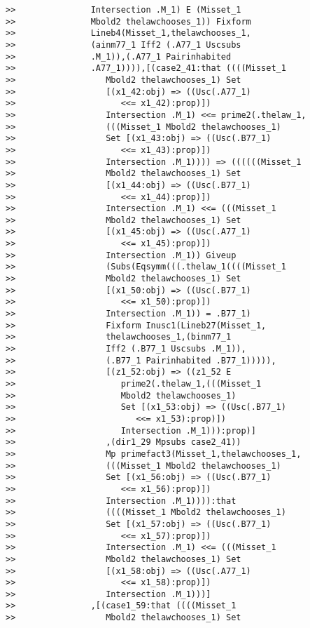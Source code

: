 \documentclass[12pt]{article}
\begin{document}
\begin{verbatim}
>>               Intersection .M_1) E (Misset_1
>>               Mbold2 thelawchooses_1)) Fixform
>>               Lineb4(Misset_1,thelawchooses_1,
>>               (ainm77_1 Iff2 (.A77_1 Uscsubs
>>               .M_1)),(.A77_1 Pairinhabited
>>               .A77_1)))),[(case2_41:that ((((Misset_1
>>                  Mbold2 thelawchooses_1) Set
>>                  [(x1_42:obj) => ((Usc(.A77_1)
>>                     <<= x1_42):prop)])
>>                  Intersection .M_1) <<= prime2(.thelaw_1,
>>                  (((Misset_1 Mbold2 thelawchooses_1)
>>                  Set [(x1_43:obj) => ((Usc(.B77_1)
>>                     <<= x1_43):prop)])
>>                  Intersection .M_1)))) => ((((((Misset_1
>>                  Mbold2 thelawchooses_1) Set
>>                  [(x1_44:obj) => ((Usc(.B77_1)
>>                     <<= x1_44):prop)])
>>                  Intersection .M_1) <<= (((Misset_1
>>                  Mbold2 thelawchooses_1) Set
>>                  [(x1_45:obj) => ((Usc(.A77_1)
>>                     <<= x1_45):prop)])
>>                  Intersection .M_1)) Giveup
>>                  (Subs(Eqsymm(((.thelaw_1((((Misset_1
>>                  Mbold2 thelawchooses_1) Set
>>                  [(x1_50:obj) => ((Usc(.B77_1)
>>                     <<= x1_50):prop)])
>>                  Intersection .M_1)) = .B77_1)
>>                  Fixform Inusc1(Lineb27(Misset_1,
>>                  thelawchooses_1,(binm77_1
>>                  Iff2 (.B77_1 Uscsubs .M_1)),
>>                  (.B77_1 Pairinhabited .B77_1))))),
>>                  [(z1_52:obj) => ((z1_52 E
>>                     prime2(.thelaw_1,(((Misset_1
>>                     Mbold2 thelawchooses_1)
>>                     Set [(x1_53:obj) => ((Usc(.B77_1)
>>                        <<= x1_53):prop)])
>>                     Intersection .M_1))):prop)]
>>                  ,(dir1_29 Mpsubs case2_41))
>>                  Mp primefact3(Misset_1,thelawchooses_1,
>>                  (((Misset_1 Mbold2 thelawchooses_1)
>>                  Set [(x1_56:obj) => ((Usc(.B77_1)
>>                     <<= x1_56):prop)])
>>                  Intersection .M_1)))):that
>>                  ((((Misset_1 Mbold2 thelawchooses_1)
>>                  Set [(x1_57:obj) => ((Usc(.B77_1)
>>                     <<= x1_57):prop)])
>>                  Intersection .M_1) <<= (((Misset_1
>>                  Mbold2 thelawchooses_1) Set
>>                  [(x1_58:obj) => ((Usc(.A77_1)
>>                     <<= x1_58):prop)])
>>                  Intersection .M_1)))]
>>               ,[(case1_59:that ((((Misset_1
>>                  Mbold2 thelawchooses_1) Set

\end{verbatim}
\end{document}
